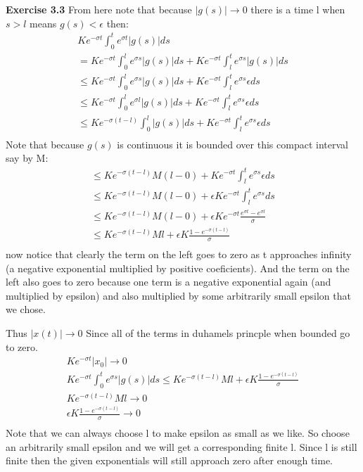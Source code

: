 \documentclass[12pt]{article}
\newenvironment{exercise}[1]{\vspace{.1in}\noindent\textbf{Exercise #1 \hspace{.05em}}}{}
\theoremstyle{definition}
\theoremstyle{remark}
\begin{document}
\begin{exercise}{3.3}
	From here note that because $|g(s)|\rightarrow 0$ there is a time l when $s>l$ means $g(s)<\epsilon$ then:
	\begin{align}
		Ke^{-\sigma t}\int_0^t e^{\sigma t}|g(s)|ds                                                      \\
		=Ke^{-\sigma t}\int_0^l e^{\sigma s}|g(s)|ds+ Ke^{-\sigma t}\int_l^t e^{\sigma s}|g(s)|ds        \\
		\leq Ke^{-\sigma t}\int_0^l e^{\sigma s}|g(s)|ds+ Ke^{-\sigma t}\int_l^t e^{\sigma s}\epsilon ds \\
		\leq Ke^{-\sigma t}\int_0^l e^{\sigma l}|g(s)|ds+ Ke^{-\sigma t}\int_l^t e^{\sigma s}\epsilon ds \\
		\leq Ke^{-\sigma (t-l)}\int_0^l |g(s)|ds+ Ke^{-\sigma t}\int_l^t e^{\sigma s}\epsilon ds         \\
	\end{align}
	Note that because $g(s)$ is continuous it is bounded over this compact interval say by M:
	\begin{align}
		\leq Ke^{-\sigma (t-l)}M(l-0) + Ke^{-\sigma t}\int_l^t e^{\sigma s}\epsilon ds                  \\
		\leq Ke^{-\sigma (t-l)}M(l-0) + \epsilon Ke^{-\sigma t}\int_l^t e^{\sigma s} ds                 \\
		\leq Ke^{-\sigma (t-l)}M(l-0) + \epsilon Ke^{-\sigma t}\frac{e^{\sigma t}-e^{\sigma l}}{\sigma} \\
		\leq Ke^{-\sigma (t-l)}Ml + \epsilon K\frac{1-e^{-\sigma (t-l)}}{\sigma}                        \\
	\end{align}
	now notice that clearly the term on the left goes to zero as t approaches infinity  (a negative exponential multiplied by positive coeficients). And the term on the left also goes to zero because one term is a negative exponential again (and multiplied by epsilon) and also multiplied by some arbitrarily small epsilon that we chose.

	Thus $|x(t)|\rightarrow 0$ Since all of the terms in duhamels princple when bounded go to zero.
	\begin{align}
		Ke^{-\sigma t}|x_0|\rightarrow 0                                                                                     \\
		Ke^{-\sigma t}\int_0^t e^{\sigma s}|g(s)|ds \leq Ke^{-\sigma (t-l)}Ml + \epsilon K\frac{1-e^{-\sigma (t-l)}}{\sigma} \\
		Ke^{-\sigma (t-l)}Ml\rightarrow 0                                                                                    \\
		\epsilon K\frac{1-e^{-\sigma (t-l)}}{\sigma}  \rightarrow 0                                                          \\
	\end{align}
	Note that we can always choose l to make epsilon as small as we like. So choose an arbitrarily small epsilon and we will get a corresponding finite l. Since l is still finite then the given exponentials will still approach zero after enough time.


\end{exercise}
\end{document}
